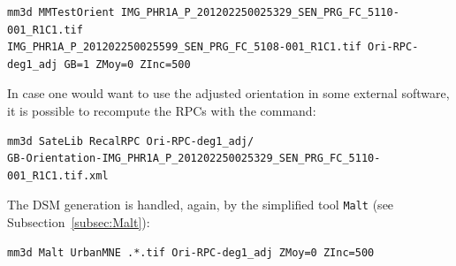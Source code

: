 \begin{verbatim}
mm3d MMTestOrient IMG_PHR1A_P_201202250025329_SEN_PRG_FC_5110-001_R1C1.tif 
IMG_PHR1A_P_201202250025599_SEN_PRG_FC_5108-001_R1C1.tif Ori-RPC-deg1_adj GB=1 ZMoy=0 ZInc=500
\end{verbatim}
%
In case one would want to use the adjusted orientation in some external software, it is possible to recompute the RPCs with the command:
\begin{verbatim}
mm3d SateLib RecalRPC Ori-RPC-deg1_adj/
GB-Orientation-IMG_PHR1A_P_201202250025329_SEN_PRG_FC_5110-001_R1C1.tif.xml
\end{verbatim}
The DSM generation is handled, again, by the simplified tool {\tt Malt} (see Subsection~\ref{subsec:Malt}): 
\begin{verbatim}
mm3d Malt UrbanMNE .*.tif Ori-RPC-deg1_adj ZMoy=0 ZInc=500
\end{verbatim}
%

